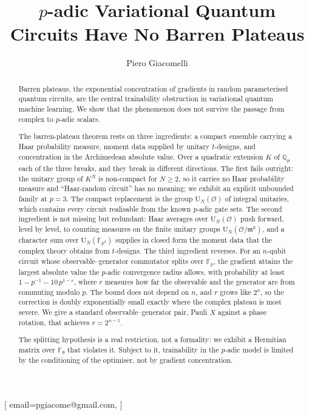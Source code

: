 \documentclass{ceurart}
\theoremstyle{plain}
\theoremstyle{definition}
\theoremstyle{remark}
\theoremstyle{plain}
\newcommand{\Qp}{\mathbb{Q}_p}
\newcommand{\OK}{\mathcal{O}}
\newcommand{\mm}{\mathfrak{m}}
\newcommand{\Uni}{\mathrm{U}}
\newcommand{\FF}{\mathbb{F}}
\begin{document}


\title{$p$-adic Variational Quantum Circuits Have No Barren Plateaus}

\author[1]{Piero Giacomelli}[%
email=pgiacome@gmail.com,
]
\address[1]{Tenax SPA, Verona, Italy}

\begin{abstract}
Barren plateaus, the exponential concentration of gradients in random
parameterised quantum circuits, are the central trainability obstruction in
variational quantum machine learning. We show that the phenomenon does not
survive the passage from complex to $p$-adic scalars.

The barren-plateau theorem rests on three ingredients: a compact ensemble
carrying a Haar probability measure, moment data supplied by unitary
$t$-designs, and concentration in the Archimedean absolute value. Over a
quadratic extension $K$ of $\Qp$ each of the three breaks, and they break in
different directions. The first fails outright: the unitary group of $K^{N}$ is
non-compact for $N\ge 2$, so it carries no Haar probability measure and
``Haar-random circuit'' has no meaning; we exhibit an explicit unbounded family
at $p=3$. The compact replacement is the group $\Uni_N(\OK)$ of integral
unitaries, which contains every circuit realisable from the known $p$-adic gate
sets. The second ingredient is not missing but redundant: Haar averages over
$\Uni_N(\OK)$ push forward, level by level, to counting measures on the finite
unitary groups $\Uni_N(\OK/\mm^{k})$, and a character sum over
$\Uni_N(\FF_{p^2})$ supplies in closed form the moment data that the complex
theory obtains from $t$-designs. The third ingredient reverses. For an
$n$-qubit circuit whose observable--generator commutator splits over $\FF_p$,
the gradient attains the largest absolute value the $p$-adic convergence radius
allows, with probability at least $1-p^{-1}-10\,p^{1-r}$, where $r$ measures how
far the observable and the generator are from commuting modulo $p$. The bound
does not depend on $n$, and $r$ grows like $2^{n}$, so the correction is doubly
exponentially small exactly where the complex plateau is most severe. We give a
standard observable--generator pair, Pauli $X$ against a phase rotation, that
achieves $r=2^{n-1}$.

The splitting hypothesis is a real restriction, not a formality: we exhibit a
Hermitian matrix over $\FF_9$ that violates it. Subject to it, trainability in
the $p$-adic model is limited by the conditioning of the optimiser, not by
gradient concentration.
\end{abstract}
\end{document}
